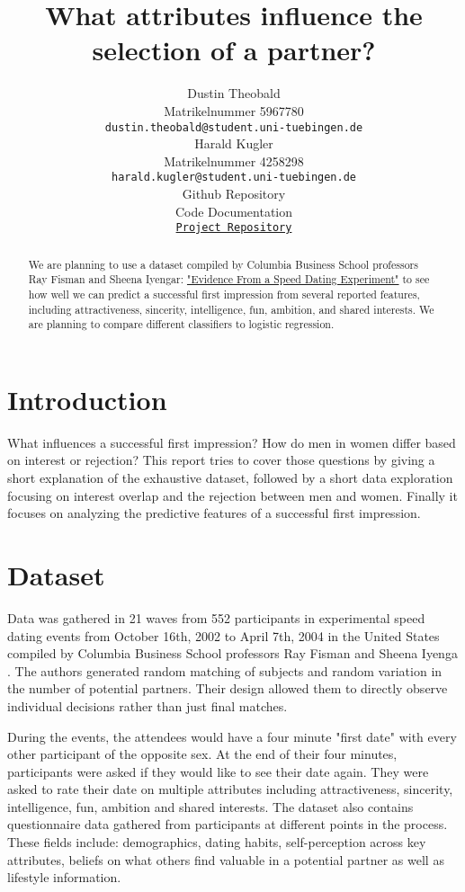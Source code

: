 \documentclass{article}
\title{What attributes influence the selection of a partner?}
\author{%
  Dustin Theobald\\
  Matrikelnummer 5967780\\
  \texttt{dustin.theobald@student.uni-tuebingen.de} \\
  \And
  Harald Kugler\\
  Matrikelnummer 4258298\\
  \texttt{harald.kugler@student.uni-tuebingen.de} \\
  \And
  Github Repository\\
  Code Documentation\\
  \texttt{\href{https://github.com/dtheo91/DataLiteracyPractical}{Project Repository}}
}
\begin{document}
\maketitle

\begin{abstract}
   We are planning to use a dataset compiled by Columbia Business School professors Ray Fisman and Sheena Iyengar: \href{https://www.kaggle.com/annavictoria/speed-dating-experiment/home?select=Speed+Dating+Data.csv}{"Evidence From a Speed Dating Experiment"} to see how well we can predict a successful first impression from several reported features, including attractiveness, sincerity, intelligence, fun, ambition, and shared interests. We are planning to compare different classifiers to logistic regression.
\end{abstract}

\section{Introduction}
What influences a successful first impression? How do men in women differ based on interest or rejection? This report tries to cover those questions by giving a short explanation of the exhaustive dataset, followed by a short data exploration focusing on interest overlap and the rejection between men and women. Finally it focuses on analyzing the predictive features of a successful first impression. 

\section{Dataset}
Data \cite{fisman2006gender} was gathered in 21 waves from 552 participants in experimental speed dating events from October 16th, 2002 to April 7th, 2004 in the United States compiled by Columbia Business School professors Ray Fisman and Sheena Iyenga \cite{speeddata}.
The authors generated random matching of subjects and random variation in the number of potential partners. Their design allowed them to directly observe individual decisions rather than just final matches.

During the events, the attendees would have a four minute "first date" with every other participant of the opposite sex.
At the end of their four minutes, participants were asked if they would like to see their date again. 
They were asked to rate their date on multiple attributes including
attractiveness,
sincerity,
intelligence,
fun,
ambition and
shared interests.
The dataset also contains questionnaire data gathered from participants at different points in the process. These fields include:
demographics,
dating habits,
self-perception across key attributes,
beliefs on what others find valuable in a potential partner
as well as lifestyle information.
\end{document}

